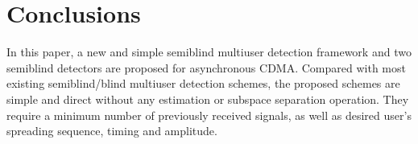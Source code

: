 \documentclass[a4paper,10pt,fleqn, twocolumn]{IEEETran}
\begin{document}
\section{Conclusions}
In this paper, a new and simple semiblind multiuser detection
framework and two semiblind detectors are proposed for
asynchronous CDMA. Compared with most existing semiblind/blind
multiuser detection schemes, the proposed schemes are simple and
direct without any estimation or subspace separation operation.
They require a minimum number of previously received signals, as
well as desired user's spreading sequence, timing and amplitude.
\small


\end{document}
